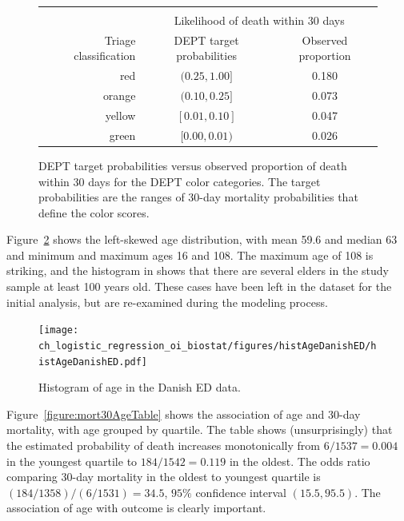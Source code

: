 \begin{figure}[ht]
\centering
\begin{tabular}{rcc}
  \hline \\
  & \multicolumn{2}{c}{Likelihood of death within 30 days} \\
Triage classification & DEPT target probabilities & Observed proportion  \\
  \hline
red & $(0.25, 1.00]$ & 0.180   \\
orange & $(0.10, 0.25]$ & 0.073   \\
yellow & $[0.01, 0.10]$ & 0.047   \\
green & $[0.00, 0.01)$ & 0.026   \\
   \hline
\end{tabular}
\caption{DEPT target probabilities  versus observed proportion of death within 30 days for the DEPT color categories. The target probabilities are the ranges of 30-day mortality probabilities that define the color scores.} 
\label{figure:predVsObsTriageMort30Table}
\end{figure}

Figure~\ref{figure:histAgeDanishED} shows the left-skewed age distribution, with mean 59.6 and median 63 and minimum and maximum ages 16 and 108.  The maximum age of 108 is striking, and the histogram in shows that there are several elders in the study sample at least 100  years old.  These cases have been left in the dataset for the initial analysis, but are re-examined during the modeling process.

\begin{figure}[!tbh]
  \centering
  \texttt{[image: ch\_logistic\_regression\_oi\_biostat/figures/histAgeDanishED/histAgeDanishED.pdf]}
    \caption{Histogram of age in the Danish ED data.}
    \label{figure:histAgeDanishED}
\end{figure}

Figure~\ref{figure:mort30AgeTable} shows the association of age and 30-day mortality, with age grouped by quartile. The table shows (unsurprisingly) that the estimated probability of death increases monotonically from $6/1537 = 0.004$ in the youngest quartile to $184/1542 = 0.119$ in the oldest.  The odds ratio comparing 30-day mortality in the oldest to youngest quartile  is $(184/1358)/(6/1531) = 34.5$, $95\%$ confidence interval $(15.5, 95.5)$.  The association of age with outcome is clearly important.

